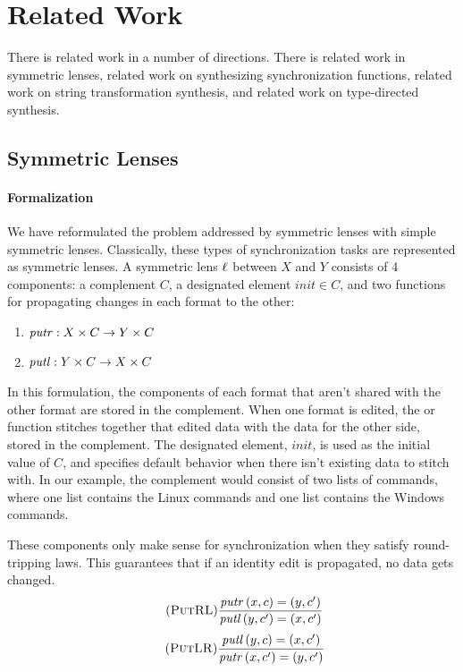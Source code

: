 \documentclass[acmsmall,screen,anonymous]{acmart}
\begin{document}
\section{Related Work}
\label{sec:related}
There is related work in a number of directions.  There is related work in
symmetric lenses, related work on synthesizing synchronization functions,
related work on string transformation synthesis, and related work on
type-directed synthesis.

\subsection{Symmetric Lenses}
\paragraph*{Formalization} We have reformulated the problem addressed by
symmetric lenses with simple symmetric lenses. Classically, these types of
synchronization tasks are represented as symmetric lenses. A symmetric lens
$\mathit{\ell}$ between $X$ and $Y$ consists of 4 components: a complement $C$, a
designated element $init \in C$, and two functions for propagating changes in
each format to the other:
\begin{enumerate}
\item $\mathit{putr} : X \times C \rightarrow Y \times C$
\item $\mathit{putl} : Y \times C \rightarrow X \times C$
\end{enumerate}
In this formulation, the components of each format that aren't shared with the
other format are stored in the complement. When one format is edited, the \PutR
or \PutL function stitches together that edited data with the data for the other
side, stored in the complement.  The designated element, $init$, is used as the
initial value of $C$, and specifies default behavior when there isn't existing
data to stitch with.  In our example, the complement would consist of two lists
of commands, where one list contains the Linux commands and one list contains
the Windows commands.

These components only make sense for synchronization when they satisfy
round-tripping laws.  This guarantees that if an identity edit is propagated, no
data gets changed.
\begin{equation}
  \tag{\PutRL}
  \frac{\PutRSymOf{(x,c)} = (y,c')}{\PutLSymOf{(y,c')} = (x,c')}
\end{equation}
\begin{equation}
  \tag{\PutLR}
  \frac{\PutLSymOf{(y,c)} = (x,c')}{\PutRSymOf{(x,c')} = (y,c')}
\end{equation}
\end{document}
